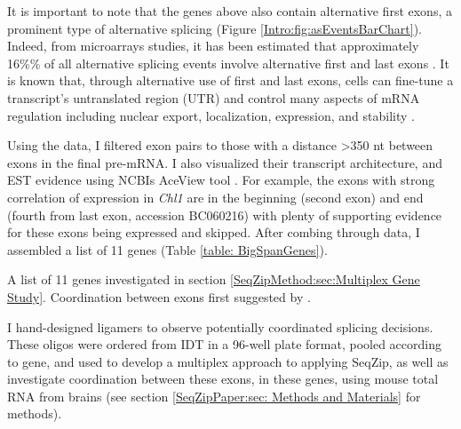   It is important to note that the genes above also contain alternative first exons, a prominent type of alternative splicing (Figure \ref{Intro:fig:asEventsBarChart}). Indeed, from microarrays studies, it has been estimated that approximately 16\%\% of all alternative splicing events involve alternative first and last exons \citep{Bingham2008}. It is known that, through alternative use of first and last exons, cells can fine-tune a transcript's untranslated region (UTR) and control many aspects of mRNA regulation including nuclear export, localization, expression, and stability \citep{Hughes2006}.

  Using the \citet{Fagnani2007} data, I filtered exon pairs to those with a distance >350 nt between exons in the final pre-mRNA. I also visualized their transcript architecture, and EST evidence using NCBIs AceView tool \citep{Thierry-Mieg2006}. For example, the exons with strong correlation of expression in \textit{Chl1} are in the beginning (second exon) and end (fourth from last exon, accession BC060216) with plenty of supporting evidence for these exons being expressed and skipped. After combing through \citep{Fagnani2007} data, I assembled a list of 11 genes (Table \ref{table: BigSpanGenes}).

  \begin{table} %
    \caption[Mouse genes with large sequence between suggested coordinated cassette exons]
      {
        A list of 11 genes investigated in section \ref{SeqZipMethod:sec:Multiplex Gene Study}. Coordination between exons first suggested by \citep{Fagnani2007}.
        }
    \label{table: BigSpanGenes}
    
    \end{table}

  I hand-designed ligamers to observe potentially coordinated splicing decisions. These oligos were ordered from IDT in a 96-well plate format, pooled according to gene, and used to develop a multiplex approach to applying SeqZip, as well as investigate coordination between these exons, in these genes, using mouse total RNA from brains (see section \ref{SeqZipPaper:sec: Methods and Materials} for methods).

